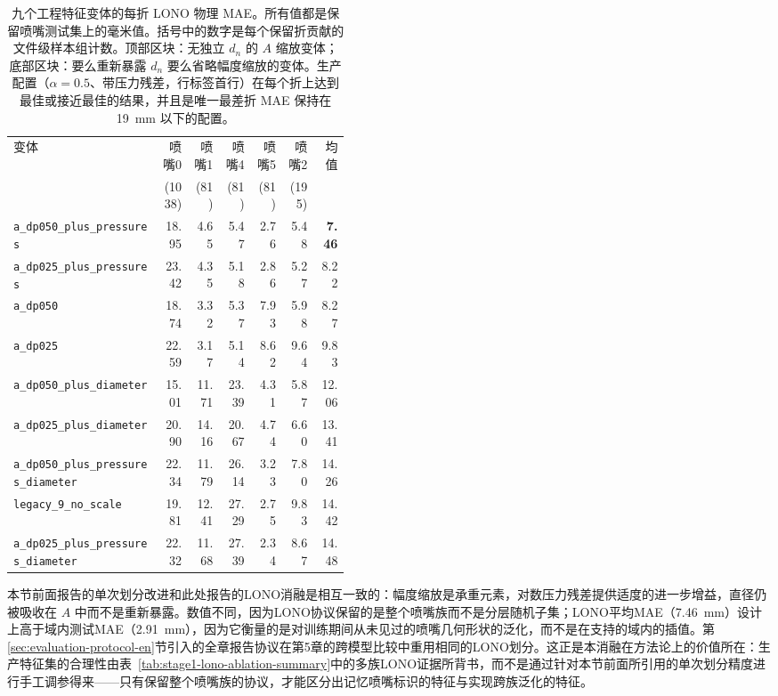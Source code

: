 \begin{table}[t]
\centering
\footnotesize
\setlength{\tabcolsep}{4pt}
\begin{tabular}{@{}L{0.44\linewidth}rrrrr|r@{}}
\toprule
变体 & 喷嘴0 & 喷嘴1 & 喷嘴4 & 喷嘴5 & 喷嘴2 & 均值 \\
& \footnotesize(1038) & \footnotesize(81) & \footnotesize(81) & \footnotesize(81) & \footnotesize(195) & \\
\midrule
\texttt{a\_dp050\_plus\_pressures} & 18.95 & 4.65 & 5.47 & 2.76 & 5.48 & \textbf{7.46} \\
\texttt{a\_dp025\_plus\_pressures} & 23.42 & 4.35 & 5.18 & 2.86 & 5.27 & 8.22 \\
\texttt{a\_dp050} & 18.74 & 3.32 & 5.37 & 7.93 & 5.98 & 8.27 \\
\texttt{a\_dp025} & 22.59 & 3.17 & 5.14 & 8.62 & 9.64 & 9.83 \\
\midrule
\texttt{a\_dp050\_plus\_diameter} & 15.01 & 11.71 & 23.39 & 4.31 & 5.87 & 12.06 \\
\texttt{a\_dp025\_plus\_diameter} & 20.90 & 14.16 & 20.67 & 4.74 & 6.60 & 13.41 \\
\texttt{a\_dp050\_plus\_pressures\_diameter} & 22.34 & 11.79 & 26.14 & 3.23 & 7.80 & 14.26 \\
\texttt{legacy\_9\_no\_scale} & 19.81 & 12.41 & 27.29 & 2.75 & 9.83 & 14.42 \\
\texttt{a\_dp025\_plus\_pressures\_diameter} & 22.32 & 11.68 & 27.39 & 2.34 & 8.67 & 14.48 \\
\bottomrule
\end{tabular}
\caption{九个工程特征变体的每折 LONO 物理 MAE。所有值都是保留喷嘴测试集上的毫米值。括号中的数字是每个保留折贡献的文件级样本组计数。顶部区块：无独立 \(d_n\) 的 \(A\) 缩放变体；底部区块：要么重新暴露 \(d_n\) 要么省略幅度缩放的变体。生产配置（\(\alpha=0.5\)、带压力残差，行标签首行）在每个折上达到最佳或接近最佳的结果，并且是唯一最差折 MAE 保持在 \SI{19}{mm} 以下的配置。}
\label{tab:stage1-lono-ablation-per-fold}
\end{table}

本节前面报告的单次划分改进和此处报告的LONO消融是相互一致的：幅度缩放是承重元素，对数压力残差提供适度的进一步增益，直径仍被吸收在 \(A\) 中而不是重新暴露。数值不同，因为LONO协议保留的是整个喷嘴族而不是分层随机子集；LONO平均MAE（\SI{7.46}{mm}）设计上高于域内测试MAE（\SI{2.91}{mm}），因为它衡量的是对训练期间从未见过的喷嘴几何形状的泛化，而不是在支持的域内的插值。第\ref{sec:evaluation-protocol-en}节引入的全章报告协议在第5章的跨模型比较中重用相同的LONO划分。这正是本消融在方法论上的价值所在：生产特征集的合理性由表~\ref{tab:stage1-lono-ablation-summary}中的多族LONO证据所背书，而不是通过针对本节前面所引用的单次划分精度进行手工调参得来——只有保留整个喷嘴族的协议，才能区分出记忆喷嘴标识的特征与实现跨族泛化的特征。

